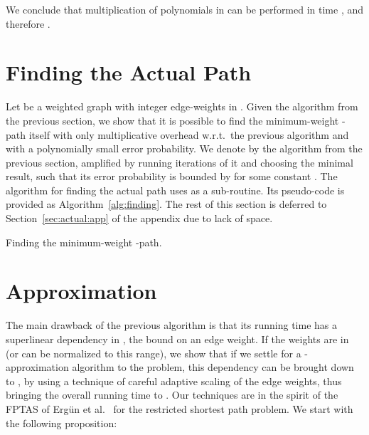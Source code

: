\documentclass{llncs}
\begin{document}
We conclude that multiplication of polynomials in  can be performed in time , and therefore .



\section{Finding the Actual Path}\label{sec:actual}
Let  be a weighted graph with integer edge-weights in . Given the algorithm from the previous section, we show that it is possible to find the minimum-weight -path itself with only  multiplicative overhead w.r.t.\ the previous algorithm and with a polynomially small error probability. 
We denote by  the algorithm from the previous section, amplified by running  iterations of it and choosing the minimal result, such that its error probability is bounded by  for some constant . 
The algorithm for finding the actual path uses  as a sub-routine. Its pseudo-code is provided as Algorithm~\ref{alg:finding}. 
The rest of this section is deferred to Section~\ref{sec:actual:app} of the appendix due to lack of space.

\begin{algorithm}[t]\label{alg:finding}
\caption{Finding the minimum-weight -path.}
\;
\Return{}

\end{algorithm}





\section{Approximation}\label{sec:approx}
The main drawback of the previous algorithm is that its running time has a superlinear dependency in , the bound on an edge weight. If the weights are in  (or can be normalized to this range), we show that if we settle for a -approximation algorithm to the problem, this dependency can be brought down to , by using a technique of careful adaptive scaling of the edge weights, thus bringing the overall running time to . Our techniques are in the spirit of the FPTAS of Erg{\"u}n et al.~\cite{ESZ02} for the restricted shortest path problem.  
We start with the following proposition:
\end{document}
